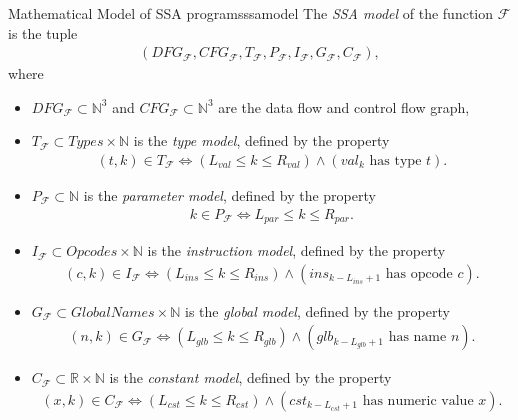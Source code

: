 \begin{definition}{Mathematical Model of SSA programs}{ssamodel}
    The {\em SSA model} of the function $\mathcal F$ is the tuple
    \begin{align*}
        (DFG_\mathcal{F},
         CFG_\mathcal{F},
         T_\mathcal{F},
         P_\mathcal{F},
         I_\mathcal{F},
         G_\mathcal{F},
         C_\mathcal{F}),
    \end{align*}
    where
    \begin{itemize}
    \item $DFG_\mathcal{F}\subset\mathbb N^3$ and
          $CFG_\mathcal{F}\subset\mathbb N^3$ are the data flow and control
          flow graph,
    \item $T_\mathcal F\subset\textit{Types}\times\mathbb N$ is the {\it type model},
          defined by the property
          \begin{align*}
              (t,k)\in T_\mathcal F\iff\left(L_{val}\leq k\leq R_{val}\right)
                  \mathrel\land(val_k\text{ has type }t).
          \end{align*}
    \item $P_\mathcal F\subset\mathbb N$ is the {\it parameter model}, defined
          by the property
          \begin{align*}
              k\in P_\mathcal F\iff L_{par}\leq k\leq R_{par}.
          \end{align*}
    \item $I_\mathcal F\subset\textit{Opcodes}\times \mathbb N$ is the
          {\it instruction model}, defined by the property
          \begin{align*}
              (c,k)\in I_\mathcal F\iff\left(L_{ins}\leq k\leq R_{ins}\right)
                  \mathrel{\land}(ins_{k-L_{ins}+1}\text{ has opcode }c).
          \end{align*}
    \item $G_\mathcal F\subset\textit{GlobalNames}\times\mathbb N$ is the
          {\it global model}, defined by the property
          \begin{align*}
              (n,k)\in G_\mathcal F\iff\left(L_{glb}\leq k\leq R_{glb}\right)
                  \mathrel{\land}(glb_{k-L_{glb}+1}\text{ has name }n).
          \end{align*}
    \item $C_\mathcal F\subset\mathbb R\times\mathbb N$ is the
          {\it constant model}, defined by the property
          \begin{align*}
              (x,k)\in C_\mathcal F\iff\left(L_{cst}\leq k\leq R_{cst}\right)
                  \mathrel{\land}(cst_{k-L_{cst}+1}\text{ has numeric value }x).
          \end{align*}
    \end{itemize}
\end{definition}

